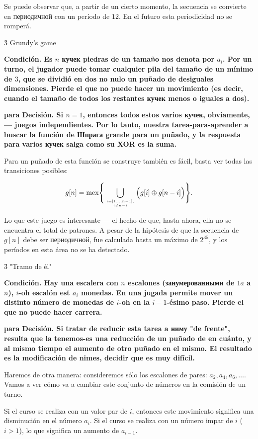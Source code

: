 Se puede observar que, a partir de un cierto momento, la secuencia se convierte en периодичной con un período de $12$. En el futuro esta periodicidad no se romperá.


\h3{ Grundy's game }

\bf{Condición}. Es $n$ кучек piedras de un tamaño nos denota por $a_i$. Por un turno, el jugador puede tomar cualquier pila del tamaño de un mínimo de $3$, que se dividió en dos no nulo un puñado de desiguales dimensiones. Pierde el que no puede hacer un movimiento (es decir, cuando el tamaño de todos los restantes кучек menos o iguales a dos).

\bf{para Decisión}. Si $n = 1$, entonces todos estos varios кучек, obviamente, --- juegos independientes. Por lo tanto, nuestra tarea-para-aprender a buscar la función de Шпрага grande para un puñado, y la respuesta para varios кучек salga como su XOR es la suma.

Para un puñado de esta función se construye también es fácil, basta ver todas las transiciones posibles:

$$ g[n] = {\rm mex} \Bigg\{ \bigcup_{i=[1 \ldots, n-1], \atop i \ne n-i } \Big( g[i] \oplus g[n-i] \Big) \Bigg\}. $$

Lo que este juego es interesante --- el hecho de que, hasta ahora, ella no se encuentra el total de patrones. A pesar de la hipótesis de que la secuencia de $g[n]$ debe ser периодичной, fue calculada hasta un máximo de $2^{35}$, y los períodos en esta área no se ha detectado.


\h3{ "Tramo de él" }

\bf{Condición}. Hay una escalera con $n$ escalones (занумерованными de $1 a$ a $n$), $i$-oh escalón est $a_i$ monedas. En una jugada permite mover un distinto número de monedas de $i$-oh en la $i-1$-ésimo paso. Pierde el que no puede hacer carrera.

\bf{para Decisión}. Si tratar de reducir esta tarea a ниму "de frente", resulta que la tenemos-es una reducción de un puñado de en cuánto, y al mismo tiempo el aumento de otro puñado en el mismo. El resultado es la modificación de nimes, decidir que es muy difícil.

Haremos de otra manera: consideremos sólo los escalones de pares: $a_2, a_4, a_6, \ldots$. Vamos a ver cómo va a cambiar este conjunto de números en la comisión de un turno.

Si el curso se realiza con un valor par de $i$, entonces este movimiento significa una disminución en el número $a_i$. Si el curso se realiza con un número impar de $i$ ($i > 1$), lo que significa un aumento de $a_{i-1}$.

